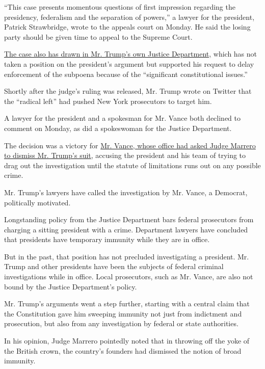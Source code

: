 ``This case presents momentous questions of first impression regarding
the presidency, federalism and the separation of powers,'' a lawyer for
the president, Patrick Strawbridge, wrote to the appeals court on
Monday. He said the losing party should be given time to appeal to the
Supreme Court.

\href{https://www.nytimes3xbfgragh.onion/2019/10/02/nyregion/trump-taxes-lawsuit.html}{The
case also has drawn in Mr. Trump's own Justice Department,} which has
not taken a position on the president's argument but supported his
request to delay enforcement of the subpoena because of the
``significant constitutional issues.''

Shortly after the judge's ruling was released, Mr. Trump wrote on
Twitter that the ``radical left'' had pushed New York prosecutors to
target him.

A lawyer for the president and a spokesman for Mr. Vance both declined
to comment on Monday, as did a spokeswoman for the Justice Department.

The decision was a victory for
\href{https://www.nytimes3xbfgragh.onion/2019/09/23/nyregion/trump-tax-returns-lawsuit.html?module=inline}{Mr.
Vance, whose office had asked Judge Marrero to dismiss Mr. Trump's
suit}, accusing the president and his team of trying to drag out the
investigation until the statute of limitations runs out on any possible
crime.

Mr. Trump's lawyers have called the investigation by Mr. Vance, a
Democrat, politically motivated.

Longstanding policy from the Justice Department bars federal prosecutors
from charging a sitting president with a crime. Department lawyers have
concluded that presidents have temporary immunity while they are in
office.

But in the past, that position has not precluded investigating a
president. Mr. Trump and other presidents have been the subjects of
federal criminal investigations while in office. Local prosecutors, such
as Mr. Vance, are also not bound by the Justice Department's policy.

Mr. Trump's arguments went a step further, starting with a central claim
that the Constitution gave him sweeping immunity not just from
indictment and prosecution, but also from any investigation by federal
or state authorities.

In his opinion, Judge Marrero pointedly noted that in throwing off the
yoke of the British crown, the country's founders had dismissed the
notion of broad immunity.

